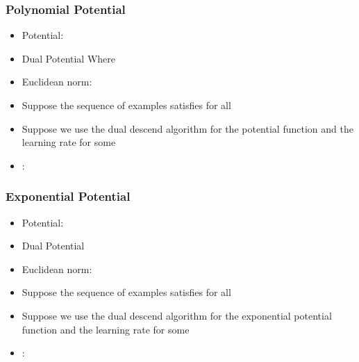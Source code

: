 \documentclass[handout]{beamer}
\begin{document}
\begin{frame}
  \frametitle{Polynomial Potential}
  \begin{itemize}
  \item Potential: 
  \item Dual Potential  Where
  \item Euclidean norm: 
  \item Suppose the sequence of examples
     satisfies  for all 
  \item Suppose we use the dual descend algorithm for the potential
    function  and the learning rate  for some 
  \item {}:\\
  \end{itemize}
\end{frame}

\begin{frame}
\frametitle{Exponential Potential}
  \begin{itemize}
  \item Potential: 
  \item Dual Potential 
  \item Euclidean norm: 
  \item Suppose the sequence of examples
     satisfies  for all 
  \item Suppose we use the dual descend algorithm for the exponential potential
    function \R{$\Phi$} and the learning rate   for some 
  \item {}:\\
  \end{itemize}
\end{frame}
\end{document}
